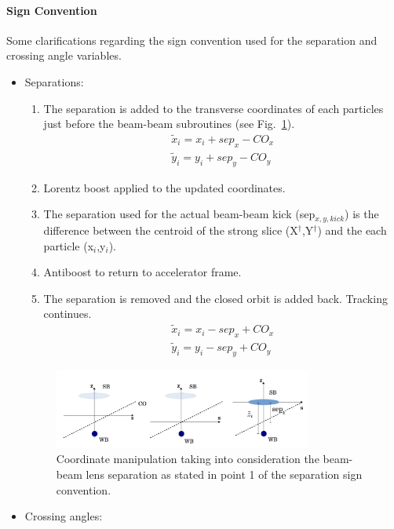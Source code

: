\paragraph{Sign Convention} Some clarifications regarding the sign convention used
for the separation and crossing angle variables.
\begin{itemize}
 \item Separations:
 \begin{enumerate}
  \item The separation is added to the transverse coordinates of each particles just before the beam-beam subroutines (see Fig.~\ref{fig:BB_sep}).
  \begin{eqnarray*}
   \tilde x_i=x_i+sep_x-CO_x \\
   \tilde y_i=y_i+sep_y-CO_y 
  \end{eqnarray*}
  \item Lorentz boost applied to the updated coordinates.
  \item The separation used for the actual beam-beam kick (sep$_{x,y,kick}$) is the difference between the centroid of the strong slice (X$^{\dag}$,Y$^{\dag}$) and the each particle (x$_i$,y$_i$).
  \item Antiboost to return to accelerator frame.
  \item The separation is removed and the closed orbit is added back. Tracking continues.
  \begin{eqnarray*}
   \tilde x_i=x_i-sep_x+CO_x \\
   \tilde y_i=y_i-sep_y+CO_y
   \end{eqnarray*}
 \end{enumerate}
 \begin{figure}[h]
 \begin{center}
 \includegraphics[width=0.8\textwidth]{figures/BB_sep}
 \caption{Coordinate manipulation taking into consideration the beam-beam lens separation as stated in point 1 of the separation sign convention.}
 \label{fig:BB_sep}
 \end{center}
\end{figure}
 \item Crossing angles:

\end{itemize}
